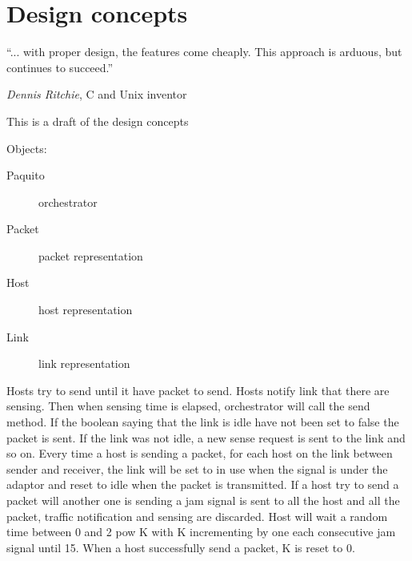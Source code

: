 \section{Design concepts}

``... with proper design, the features come cheaply. This approach is
arduous, but continues to succeed.''
\begin{flushright}
\emph{Dennis Ritchie}, C and Unix inventor
\end{flushright}

\huge{This is a draft of the design concepts}

Objects:

\begin{description}
    \item[Paquito] orchestrator
    \item[Packet] packet representation
    \item[Host] host representation
    \item[Link] link representation
\end{description}

Hosts try to send until it have packet to send.
Hosts notify link that there are sensing. Then when sensing time is elapsed,
orchestrator will call the send method. If the boolean saying that the
link is idle have not been set to false the packet is sent.
If the link was not idle, a new sense request is sent to the link and so
on.
Every time a host is sending a packet, for each host on the link between
sender and receiver, the link will be set to in use when the signal is
under the adaptor and reset to idle when the packet is transmitted.
If a host try to send a packet will another one is sending a jam signal
is sent to all the host and all the packet, traffic notification and
sensing are discarded. Host will wait a random time between 0 and 2 pow
K with K incrementing by one each consecutive jam signal until 15. When a
host successfully send a packet, K is reset to 0.


